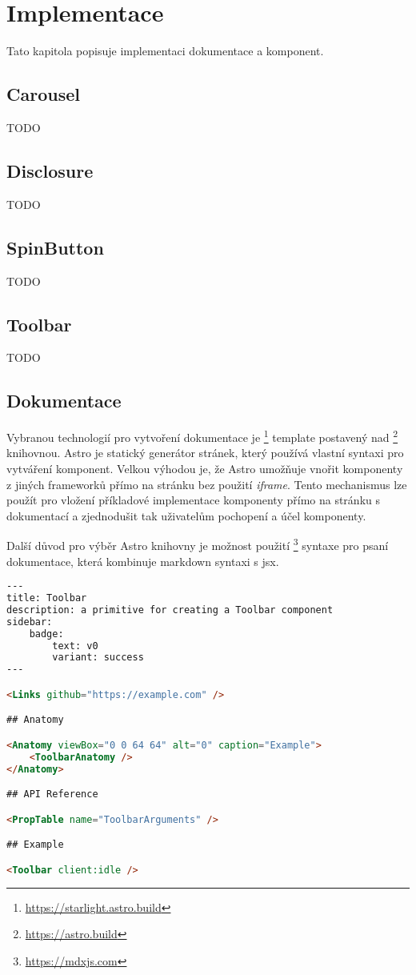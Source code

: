 \chapter{Implementace}

Tato kapitola popisuje implementaci dokumentace a komponent.

\section{Carousel}

TODO

\section{Disclosure}

TODO

\section{SpinButton}

TODO

\section{Toolbar}

TODO

\section{Dokumentace}

Vybranou technologií pro vytvoření dokumentace je \footnote{\url{https://starlight.astro.build}} template postavený nad \footnote{\url{https://astro.build}} knihovnou.
Astro je statický generátor stránek, který používá vlastní syntaxi pro vytváření komponent.
Velkou výhodou je, že Astro umožňuje vnořit komponenty z jiných frameworků přímo na stránku bez použití \textit{iframe}.
Tento mechanismus lze použít pro vložení příkladové implementace komponenty přímo na stránku s dokumentací a zjednodušit tak uživatelům pochopení a účel komponenty.

Další důvod pro výběr Astro knihovny je možnost použití \footnote{\url{https://mdxjs.com}} syntaxe pro psaní dokumentace, která kombinuje markdown syntaxi s \gls{jsx}.

\begin{lstlisting}[caption={Ukázka použití headless knihovny}, label={component-distribution-2}, language=html]
---
title: Toolbar
description: a primitive for creating a Toolbar component
sidebar:
    badge:
        text: v0
        variant: success
---

<Links github="https://example.com" />

## Anatomy

<Anatomy viewBox="0 0 64 64" alt="0" caption="Example">
    <ToolbarAnatomy />
</Anatomy>

## API Reference

<PropTable name="ToolbarArguments" />

## Example

<Toolbar client:idle />
\end{lstlisting}

